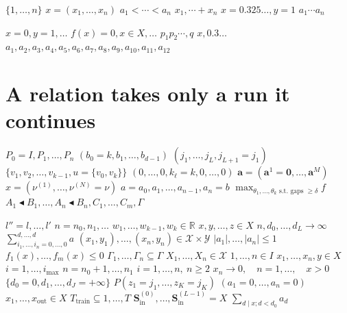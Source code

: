 \documentclass{article}
\begin{document}
$\{1,\ldots,n\}$ $x=(x_1,\ldots,x_n)$ $a_1<\cdots<a_n$ $x_1,\cdots +x_n$ $x=0.325\ldots, y=1$ $a_1\cdots a_n$

$x=0, y=1, \ldots$ $f(x)=0, x\in X, \ldots$ $p_1p_2\cdots, q$ $x, 0.3\ldots$
$a_1,a_2,a_3,a_4,a_5,a_6,a_7,a_8,a_9,a_{10},a_{11},a_{12}$

\section{A relation takes only a run it continues}
$P_0=I,P_1,\dots,P_n$ $(b_0=k,b_1,\dots,b_{d-1})$ $(j_1,\ldots,j_L,j_{L+1}=j_1)$ $\{v_1,v_2,\ldots,v_{k-1},u=\{v_0,v_k\}\}$
$(0,\ldots,0,k_{\ell}=k,0,\ldots,0)$ $\mathbf{a}=(\mathbf{a}^{1}=\mathbf{0},\ldots,\mathbf{a}^{M})$ $x=(\nu^{(1)},\ldots,\nu^{(N)}=\nu)$
$a=a_0,a_1,\dots,a_{n-1},a_n=b$ $\max_{\theta_1,\ldots,\theta_k\text{ s.t. gaps }\geq\delta} f$
$A_1\blacktriangleleft B_1,\ldots,A_n\blacktriangleleft B_n,C_1,\ldots,C_m,\Gamma$

$l''=l,\ldots,l'$ $n=n_0,n_1,\ldots$ $w_1,\dots,w_{k-1},w_k\in\mathbb{R}$ $x,y,\ldots,z\in X$ $n,d_0,\dots,d_L\to\infty$
$\sum_{i_1,\dots,i_n=0,\dots,0}^{d,\dots,d} a$ $(x_1,y_1),\ldots,(x_n,y_n)\in\mathcal{X}\times\mathcal{Y}$ $|a_1|,\ldots,|a_n|\le 1$
$f_1(x),\ldots,f_m(x)\le 0$ $\Gamma_1,\ldots,\Gamma_n\subseteq\Gamma$ $X_1,\ldots,X_n\in\mathcal{X}$ $1,\ldots,n\in I$
$x_1,\ldots,x_n,y\in X$ $i=1,\ldots,i_{\max}$ $n=n_0+1,\ldots,n_1$ $i=1,\ldots,n,\ n\geq 2$ $x_n\to 0,\quad n=1,\ldots,\quad x>0$
$\{d_0=0,d_1,\dots,d_J=+\infty\}$ $P(z_1=j_1,\ldots,z_K=j_K)$ $(a_1=0,\ldots,a_n=0)$ $x_1,\ldots,x_{\text{out}}\in X$
$T_{\text{train}}\subseteq 1,\ldots,T$ $\mathbf{S}^{(0)}_{\text{in}},\ldots,\mathbf{S}^{(L-1)}_{\text{in}}=X$ $\sum_{d\mid x;d<d_0}a_d$
\end{document}
